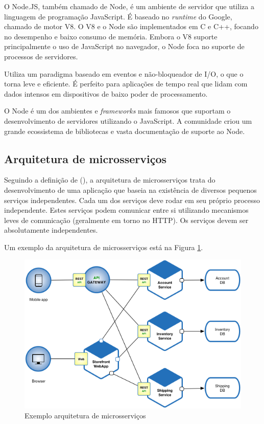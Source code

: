 O Node.JS, também chamado de Node, é um ambiente de servidor que utiliza a linguagem de programação JavaScript. É baseado no \textit{runtime} do Google, chamado de motor V8. O V8 e o Node são implementados em C e C++, focando no desempenho e baixo consumo de memória. Embora o V8 suporte principalmente o uso de JavaScript no navegador, o Node foca no suporte de processos de servidores. \cite{Tilkov2010}

Utiliza um paradigma baseado em eventos e não-bloqueador de I/O, o que o torna leve e eficiente. É perfeito para aplicações de tempo real que lidam com dados intensos em dispositivos de baixo poder de processamento. \cite{Sapes2016}

O Node é um dos ambientes e \textit{frameworks} mais famosos que suportam o desenvolvimento de servidores utilizando o JavaScript. A comunidade criou um grande ecossistema de bibliotecas e vasta documentação de suporte ao Node. \cite{Tilkov2010}

\subsection{Arquitetura de microsserviços}

Seguindo a definição de \citeauthor{ms1} (\citeyear{ms1}), a arquitetura de microsserviços trata do desenvolvimento de uma aplicação que baseia na existência de diversos pequenos serviços independentes. Cada um dos serviços deve rodar em seu próprio processo independente. Estes serviços podem comunicar entre si utilizando mecanismos leves de comunicação (geralmente em torno no HTTP). Os serviços devem ser absolutamente independentes.

Um exemplo da arquitetura de microsserviços está na Figura \ref{fig:arquitetura-microsservicos}.

\begin{figure}[htbp]
	\centering
	\includegraphics[width=1\linewidth]{figuras/Microservice_Architecture.png}
	\caption{Exemplo arquitetura de microsserviços}
	\label{fig:arquitetura-microsservicos}
\end{figure}

